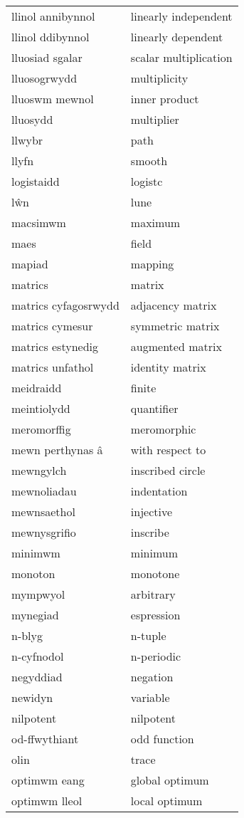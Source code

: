 \begin{supertabular}{p{0.22\textwidth}p{0.22\textwidth}}
llinol annibynnol & linearly independent \\
llinol ddibynnol & linearly dependent \\
lluosiad sgalar & scalar multiplication \\
lluosogrwydd & multiplicity \\
lluoswm mewnol & inner product \\
lluosydd & multiplier \\
llwybr & path \\
llyfn & smooth \\
logistaidd & logistc \\
lŵn & lune \\
macsimwm & maximum \\
maes & field \\
mapiad & mapping \\
matrics & matrix \\
matrics cyfagosrwydd & adjacency matrix \\
matrics cymesur & symmetric matrix \\
matrics estynedig & augmented matrix \\
matrics unfathol & identity matrix \\
meidraidd & finite \\
meintiolydd & quantifier \\
meromorffig & meromorphic \\
mewn perthynas â & with respect to \\
mewngylch & inscribed circle \\
mewnoliadau & indentation \\
mewnsaethol & injective \\
mewnysgrifio & inscribe \\
minimwm & minimum \\
monoton & monotone \\
mympwyol & arbitrary \\
mynegiad & espression \\
n-blyg & n-tuple \\
n-cyfnodol & n-periodic \\
negyddiad & negation \\
newidyn & variable \\
nilpotent & nilpotent \\
od-ffwythiant & odd function \\
olin & trace \\
optimwm eang & global optimum \\
optimwm lleol & local optimum \\

\end{supertabular}
